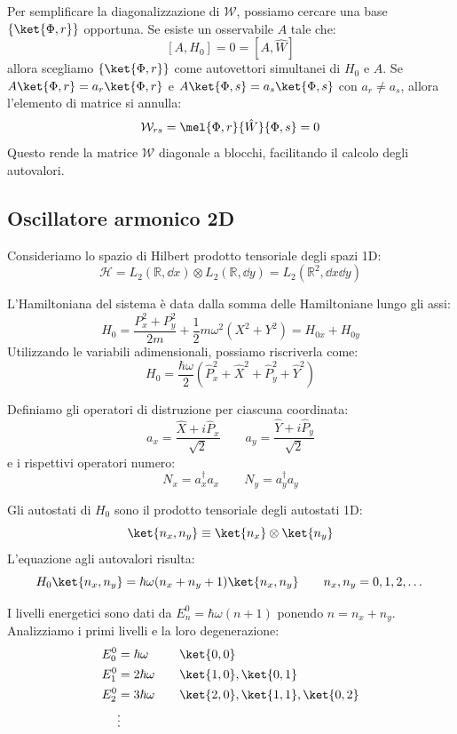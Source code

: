 Per semplificare la diagonalizzazione di $\mathcal{W}$, possiamo cercare una base $\{\ket{\Phi,r}\}$ opportuna.
Se esiste un osservabile $A$ tale che:
\[
    [A, H_0] = 0 = [A, \hat{W}]
\]
allora scegliamo $\{\ket{\Phi,r}\}$ come autovettori simultanei di $H_0$ e $A$.
Se $A\ket{\Phi,r} = a_r\ket{\Phi,r}$ e $A\ket{\Phi,s} = a_s\ket{\Phi,s}$ con $a_r \neq a_s$, allora l'elemento di matrice si annulla:
\[
    \mathcal{W}_{rs} = \mel{\Phi,r}{\hat{W}}{\Phi,s} = 0
\]
Questo rende la matrice $\mathcal{W}$ diagonale a blocchi, facilitando il calcolo degli autovalori.

\subsection{Oscillatore armonico 2D}

Consideriamo lo spazio di Hilbert prodotto tensoriale degli spazi 1D:
\[
    \mathcal{H} = L_2(\mathbb{R}, \dd{x}) \otimes L_2(\mathbb{R}, \dd{y}) = L_2(\mathbb{R}^2, \dd{x}\dd{y})
\]

L'Hamiltoniana del sistema è data dalla somma delle Hamiltoniane lungo gli assi:
\[
    H_0 = \frac{P_x^2 + P_y^2}{2m} + \frac{1}{2}m\omega^2(X^2 + Y^2) = H_{0x} + H_{0y}
\]
Utilizzando le variabili adimensionali, possiamo riscriverla come:
\[
    H_0 = \frac{\hbar\omega}{2} \left( \hat{P}_x^2 + \hat{X}^2 + \hat{P}_y^2 + \hat{Y}^2 \right)
\]

Definiamo gli operatori di distruzione per ciascuna coordinata:
\[
    a_x = \frac{\hat{X} + i\hat{P}_x}{\sqrt{2}} \qquad a_y = \frac{\hat{Y} + i\hat{P}_y}{\sqrt{2}}
\]
e i rispettivi operatori numero:
\[
    N_x = a_x^\dagger a_x \qquad N_y = a_y^\dagger a_y
\]

Gli autostati di \( H_0 \) sono il prodotto tensoriale degli autostati 1D:
\[
    \ket{n_x, n_y} \equiv \ket{n_x} \otimes \ket{n_y}
\]
L'equazione agli autovalori risulta:
\[
    H_0 \ket{n_x, n_y} = \hbar\omega(n_x + n_y + 1)\ket{n_x, n_y} \qquad n_x, n_y = 0, 1, 2, \dots
\]

I livelli energetici sono dati da \( E_n^0 = \hbar\omega(n+1) \) ponendo \( n = n_x + n_y \). Analizziamo i primi livelli e la loro degenerazione:
\begin{align*}
    E_0^0 &= \hbar\omega \quad && \ket{0,0} \\
    E_1^0 &= 2\hbar\omega \quad && \ket{1,0}, \ket{0,1} \\
    E_2^0 &= 3\hbar\omega \quad && \ket{2,0}, \ket{1,1}, \ket{0,2} \\
    &\vdots &&
\end{align*}


